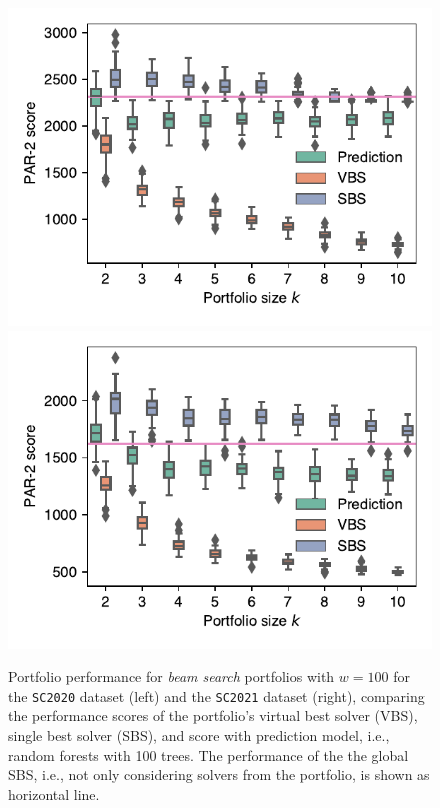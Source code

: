 \documentclass[conference]{IEEEtran}
\begin{document}
\begin{figure}[t]
	\centering
	\includegraphics[width=0.9\columnwidth]{plots/prediction-test-objective-beam-2020.pdf}
	\qquad
	\includegraphics[width=0.9\columnwidth]{plots/prediction-test-objective-beam-2021.pdf}
	\caption{
		Portfolio performance for \emph{beam search} portfolios with $w=100$ for the \texttt{SC2020} dataset (left) and the \texttt{SC2021} dataset (right), comparing the performance scores of the portfolio's virtual best solver (VBS), single best solver (SBS), and score with prediction model, i.e., random forests with 100 trees. 
		The performance of the the global SBS, i.e., not only considering solvers from the portfolio, is shown as horizontal line.
	}
	\label{fig:prediction-test-objective-beam}
\end{figure}
\end{document}
